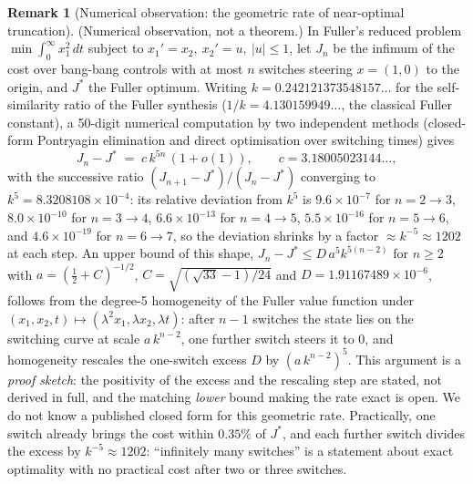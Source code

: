 \documentclass[11pt,reqno]{amsart}
\theoremstyle{definition}
\newtheorem{remark}[theorem]{Remark}
\numberwithin{equation}{section}
\begin{document}
\begin{remark}[Numerical observation: the geometric rate of near-optimal truncation]
\label{rem:fuller_rate}
\textup{(Numerical observation, not a theorem.)} In Fuller's reduced problem
$\min\int_0^\infty x_1^2\,dt$ subject to $x_1'=x_2,\ x_2'=u,\ |u|\le1$, let $J_n$ be the infimum of the
cost over bang-bang controls with at most $n$ switches steering $x=(1,0)$ to the origin, and $J^*$ the
Fuller optimum. Writing $k = 0.242121373548157\ldots$ for the self-similarity ratio of the Fuller
synthesis ($1/k = 4.130159949\ldots$, the classical Fuller constant), a 50-digit numerical computation
by two independent methods (closed-form Pontryagin elimination and direct optimisation over switching
times) gives
\[
  J_n - J^* \;=\; c\,k^{5n}\,(1+o(1)), \qquad c = 3.18005023144\ldots,
\]
with the successive ratio $(J_{n+1}-J^*)/(J_n-J^*)$ converging to $k^5=8.3208108\times10^{-4}$: its
relative deviation from $k^5$ is $9.6\times10^{-7}$ for $n=2\to3$, $8.0\times10^{-10}$ for
$n=3\to4$, $6.6\times10^{-13}$ for $n=4\to5$, $5.5\times10^{-16}$ for $n=5\to6$, and
$4.6\times10^{-19}$ for $n=6\to7$, so the deviation shrinks by a factor $\approx k^{-5}\approx1202$ at
each step. An upper bound of this shape, $J_n-J^*\le D\,a^5k^{5(n-2)}$ for $n\ge2$ with
$a=(\tfrac12+C)^{-1/2}$, $C=\sqrt{(\sqrt{33}-1)/24}$ and $D=1.91167489\times10^{-6}$, follows from the
degree-5 homogeneity of the Fuller value function under $(x_1,x_2,t)\mapsto(\lambda^2x_1,\lambda
x_2,\lambda t)$: after $n-1$ switches the state lies on the switching curve at scale $a\,k^{n-2}$, one
further switch steers it to $0$, and homogeneity rescales the one-switch excess $D$ by $(a\,k^{n-2})^5$.
This argument is a \emph{proof sketch}: the positivity of the excess and the rescaling step are stated,
not derived in full, and the matching \emph{lower} bound making the rate exact is open. We do not know
a published closed form for this geometric rate. Practically, one switch already brings the cost
within $0.35\%$ of $J^*$, and each further switch divides the excess by $k^{-5}\approx1202$:
``infinitely many switches'' is a statement about exact optimality with no practical cost after two
or three switches.
\end{remark}
\end{document}
